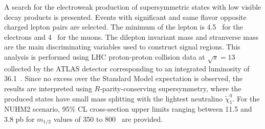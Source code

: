 A search for the electroweak production of supersymmetric states with low \pt visible decay products is presented.
Events with significant \met and same flavor opposite charged lepton pairs are selected.
The minimum \pt of the lepton is 4.5~{\GeV} for the electrons and 4~{\GeV} for the muons.
The dilepton invariant mass and stranverse mass are the main discriminating variables used to construct signal regions.
This analysis is performed using LHC proton-proton collision data at $\sqrt{s} = 13$~{\TeV} collected by the ATLAS detector corresponding to an integrated luminosity of 36.1~\ifb.
Since no excess over the Standard Model expectation is observed, the results are interpreted using $R$-parity-conserving supersymmetry, where the produced states have small mass splitting with the lightest neutralino $\widetilde{\chi}^{0}_{1}$.
For the NUHM2 scenario, 95\% CL cross-section upper limits ranging between 11.5 and 3.8 pb for $m_{1/2}$ values of 350 to 800~{\GeV} are provided.

